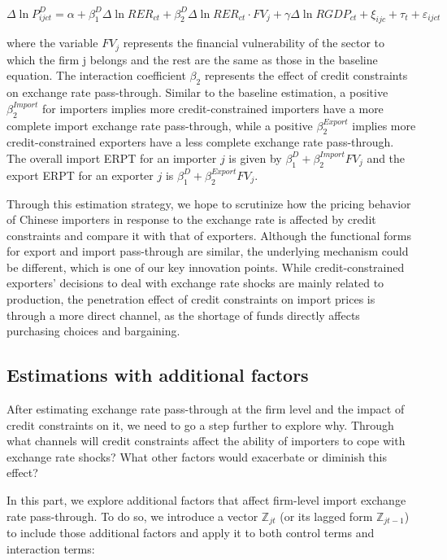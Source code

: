 \begin{equation}
	\Delta \ln P^{D}_{ijct}=\alpha+\beta^D_{1} \Delta \ln RER_{ct}+\beta^D_{2} \Delta \ln RER_{ct} \cdot FV_{j}+\gamma \Delta \ln RGDP_{ct}+\xi_{ijc}+\tau_{t} +\varepsilon_{ijct}
	\label{eq4.2}
\end{equation}

where the variable $FV_{j}$ represents the financial vulnerability of the sector to which the firm j belongs and the rest are the same as those in the baseline equation. The interaction coefficient $\beta_2$ represents the effect of credit constraints on exchange rate pass-through. Similar to the baseline estimation, a positive $\beta^{Import}_2$ for importers implies more credit-constrained importers have a more complete import exchange rate pass-through, while a positive $\beta^{Export}_2$ implies more credit-constrained exporters have a less complete exchange rate pass-through. The overall import ERPT for an importer $j$ is given by $\beta^D_{1} +\beta^{Import}_{2} FV_j$ and the export ERPT for an exporter $j$ is  $\beta^D_{1} +\beta^{Export}_{2} FV_j$.

Through this estimation strategy, we hope to scrutinize how the pricing behavior of Chinese importers in response to the exchange rate is affected by credit constraints and compare it with that of exporters. Although the functional forms for export and import pass-through are similar, the underlying mechanism could be different, which is one of our key innovation points. While credit-constrained exporters’ decisions to deal with exchange rate shocks are mainly related to production, the penetration effect of credit constraints on import prices is through a more direct channel, as the shortage of funds directly affects purchasing choices and bargaining.

\subsection{Estimations with additional factors}\label{sec-4.1.3}

After estimating exchange rate pass-through at the firm level and the impact of credit constraints on it, we need to go a step further to explore why. Through what channels will credit constraints affect the ability of importers to cope with exchange rate shocks? What other factors would exacerbate or diminish this effect?

In this part, we explore additional factors that affect firm-level import exchange rate pass-through. To do so, we introduce a vector $\mathbb{Z}_{jt}$ (or its lagged form $\mathbb{Z}_{jt-1}$) to include those additional factors and apply it to both control terms and interaction terms: 


